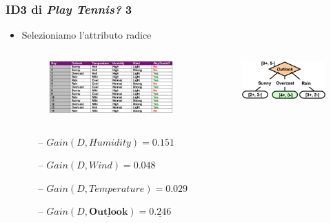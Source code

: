 \begin{frame}
	
	\frametitle{ID3 di \textit{Play Tennis?} 3}

	\begin{itemize}
		\item Selezioniamo l'attributo radice
		
		\begin{columns}
	
			\begin{figure}[!htbp]
				\centering
				\includegraphics[width=1.00\linewidth]{images/supervised/decision_trees/example_play_tennis.png}
			\end{figure}
			
			
			
			\begin{figure}[!htbp]
				\centering
				\includegraphics[width=1.1\linewidth]{images/supervised/decision_trees/example_humidity_outlook.png}
			\end{figure}
			
		\end{columns}
		
		\begin{itemize}
			\item[--] $Gain(D, Humidity) = 0.151$
			\item[--] $Gain(D, Wind) = 0.048$
			\item[--] $Gain(D, Temperature) = 0.029$
			\item[--] $Gain(D, \pmb{\underline{Outlook}}) = \pmb{\underline{0.246}}$
		\end{itemize}
		

\end{itemize}
\end{frame}
